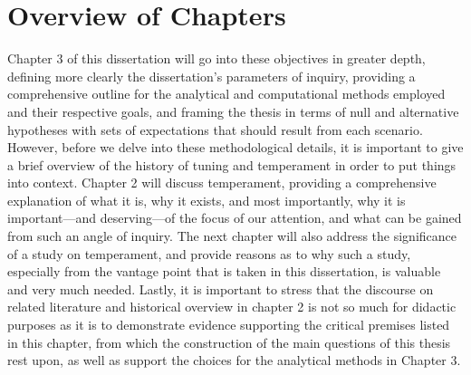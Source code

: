     \section{Overview of Chapters}\label{overview-of-chapters}

Chapter 3 of this dissertation will go into these objectives in greater
depth, defining more clearly the dissertation's parameters of inquiry,
providing a comprehensive outline for the analytical and computational
methods employed and their respective goals, and framing the thesis in
terms of null and alternative hypotheses with sets of expectations that
should result from each scenario. However, before we delve into these
methodological details, it is important to give a brief overview of the
history of tuning and temperament in order to put things into context.
Chapter 2 will discuss temperament, providing a comprehensive
explanation of what it is, why it exists, and most importantly, why it
is important---and deserving---of the focus of our attention, and what
can be gained from such an angle of inquiry. The next chapter will also
address the significance of a study on temperament, and provide reasons
as to why such a study, especially from the vantage point that is taken
in this dissertation, is valuable and very much needed. Lastly, it is
important to stress that the discourse on related literature and
historical overview in chapter 2 is not so much for didactic purposes as
it is to demonstrate evidence supporting the critical premises listed in
this chapter, from which the construction of the main questions of this
thesis rest upon, as well as support the choices for the analytical
methods in Chapter 3.

